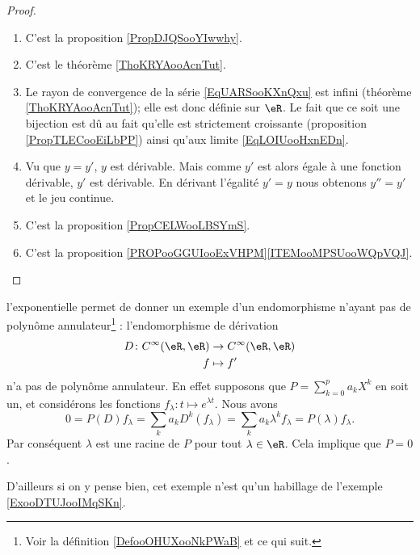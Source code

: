 \begin{proof}
    \begin{enumerate}
        \item
            C'est la proposition \ref{PropDJQSooYIwwhy}.
        \item 
            C'est le théorème \ref{ThoKRYAooAcnTut}.
        \item
            Le rayon de convergence de la série \eqref{EqUARSooKXnQxu} est infini (théorème \ref{ThoKRYAooAcnTut}); elle est donc définie sur \( \eR\). Le fait que ce soit une bijection est dû au fait qu'elle est strictement croissante (proposition \ref{PropTLECooEiLbPP}) ainsi qu'aux limite \eqref{EqLOIUooHxnEDn}.
        \item
            Vu que \( y=y'\), \( y\) est dérivable. Mais comme \( y'\) est alors égale à une fonction dérivable, \( y'\) est dérivable. En dérivant l'égalité \( y'=y\) nous obtenons \( y''=y'\) et le jeu continue.
        \item
            C'est la proposition \ref{PropCELWooLBSYmS}.
        \item
            C'est la proposition \ref{PROPooGGUIooExVHPM}\ref{ITEMooMPSUooWQpVQJ}.
    \end{enumerate}
\end{proof}

\begin{example}     \label{ExooLRHCooMYLQTU}
    l'exponentielle permet de donner un exemple d'un endomorphisme n'ayant pas de polynôme annulateur\footnote{Voir la définition \ref{DefooOHUXooNkPWaB} et ce qui suit.} : l'endomorphisme de dérivation
    \begin{equation}
        \begin{aligned}
            D\colon C^{\infty}(\eR,\eR)&\to  C^{\infty}(\eR,\eR) \\
            f&\mapsto f' 
        \end{aligned}
    \end{equation}
    n'a pas de polynôme annulateur. En effet supposons que \( P=\sum_{k=0}^{p}a_kX^k\) en soit un, et considérons les fonctions \( f_{\lambda}\colon t\mapsto  e^{\lambda t}\). Nous avons
    \begin{equation}
            0=P(D)f_{\lambda}
            =\sum_ka_kD^k(f_{\lambda})
            =\sum_ka_k\lambda^kf_{\lambda}
            =P(\lambda)f_{\lambda}.
    \end{equation}
    Par conséquent \( \lambda\) est une racine de \( P\) pour tout \( \lambda\in \eR\). Cela implique que \( P=0\).
    
    D'ailleurs si on y pense bien, cet exemple n'est qu'un habillage de l'exemple \ref{ExooDTUJooIMqSKn}.
\end{example}


